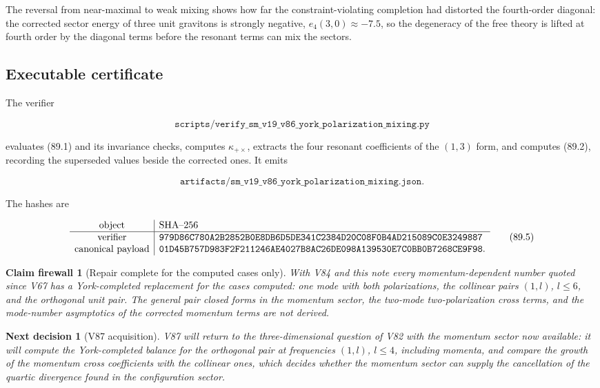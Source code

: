 \documentclass[11pt]{article}
\newtheorem{firewall}[theorem]{Claim firewall}
\newtheorem{decision}[theorem]{Next decision}
\theoremstyle{remark}
\begin{document}
The reversal from near-maximal to weak mixing shows how far the
constraint-violating completion had distorted the fourth-order
diagonal: the corrected sector energy of three unit gravitons is
strongly negative, \(e_4(3,0)\approx-7.5\), so the degeneracy of the
free theory is lifted at fourth order by the diagonal terms before the
resonant terms can mix the sectors.

\subsection{Executable certificate}

The verifier

\[
 \texttt{scripts/verify\_sm\_v19\_v86\_york\_polarization\_mixing.py}
                                                                    \tag{89.3}
\]

evaluates (89.1) and its invariance checks, computes
\(\kappa_{+\times}\), extracts the four resonant coefficients of the
\((1,3)\) form, and computes (89.2), recording the superseded values
beside the corrected ones.  It emits

\[
 \texttt{artifacts/sm\_v19\_v86\_york\_polarization\_mixing.json}.   \tag{89.4}
\]

The hashes are

\[
\begin{array}{c|l}
\hbox{object}&\hbox{SHA--256}\\ \hline
\hbox{verifier}&
\texttt{979D86C780A2B2852B0E8DB6D5DE341C2384D20C08F0B4AD215089C0E3249887}\\
\hbox{canonical payload}&
\texttt{01D45B757D983F2F211246AE4027B8AC26DE098A139530E7C0BB0B7268CE9F98}.
\end{array}                                                     \tag{89.5}
\]

\begin{firewall}[Repair complete for the computed cases only]
\label{fire:v19v86}
With V84 and this note every momentum-dependent number quoted since
V67 has a York-completed replacement for the cases computed: one
mode with both polarizations, the collinear pairs \((1,l)\), \(l\leq6\),
and the orthogonal unit pair.  The general pair closed forms in the
momentum sector, the two-mode two-polarization cross terms, and the
mode-number asymptotics of the corrected momentum terms are not
derived.
\end{firewall}

\begin{decision}[V87 acquisition]
\label{dec:v19v86-next}
V87 will return to the three-dimensional question of V82 with the
momentum sector now available: it will compute the York-completed
balance for the orthogonal pair at frequencies \((1,l)\), \(l\leq4\),
including momenta, and compare the growth of the momentum cross
coefficients with the collinear ones, which decides whether the
momentum sector can supply the cancellation of the quartic divergence
found in the configuration sector.
\end{decision}
\end{document}
